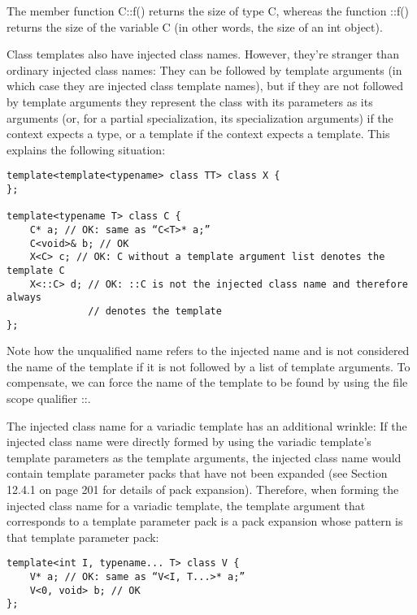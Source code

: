The member function C::f() returns the size of type C, whereas the function ::f() returns the size of the variable C (in other words, the size of an int object).

Class templates also have injected class names. However, they’re stranger than ordinary injected class names: They can be followed by template arguments (in which case they are injected class template names), but if they are not followed by template arguments they represent the class with its parameters as its arguments (or, for a partial specialization, its specialization arguments) if the context expects a type, or a template if the context expects a template. This explains the following situation:

\begin{lstlisting}[style=styleCXX]
template<template<typename> class TT> class X {
};

template<typename T> class C {
	C* a; // OK: same as “C<T>* a;”
	C<void>& b; // OK
	X<C> c; // OK: C without a template argument list denotes the template C
	X<::C> d; // OK: ::C is not the injected class name and therefore always
			  // denotes the template
};
\end{lstlisting}

Note how the unqualified name refers to the injected name and is not considered the name of the template if it is not followed by a list of template arguments. To compensate, we can force the name of the template to be found by using the file scope qualifier ::.

The injected class name for a variadic template has an additional wrinkle: If the injected class name were directly formed by using the variadic template’s template parameters as the template arguments, the injected class name would contain template parameter packs that have not been expanded (see Section 12.4.1 on page 201 for details of pack expansion). Therefore, when forming the injected class name for a variadic template, the template argument that corresponds to a template parameter pack is a pack expansion whose pattern is that template parameter pack:

\begin{lstlisting}[style=styleCXX]
template<int I, typename... T> class V {
	V* a; // OK: same as “V<I, T...>* a;”
	V<0, void> b; // OK
};
\end{lstlisting}


